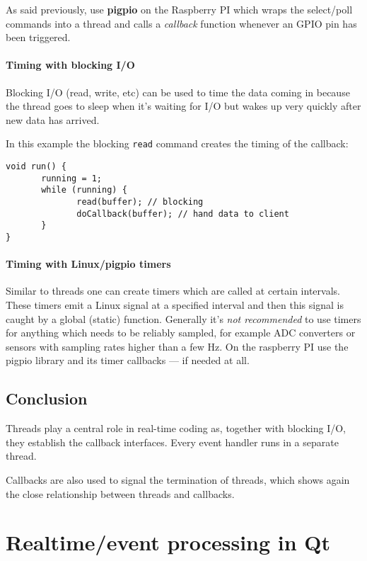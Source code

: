 \documentclass[12pt]{report}
\begin{document}
As said previously, use \textbf{pigpio} on the Raspberry PI
which wraps the select/poll commands into a thread and calls a
\textsl{callback} function whenever an GPIO pin has been triggered.


\subsubsection{Timing with blocking I/O}
Blocking I/O (read, write, etc) can be used to time
the data coming in because the thread goes to sleep when it's waiting for
I/O but wakes up very quickly after new data has arrived.

In this example the blocking \texttt{read} command creates
the timing of the callback:
\begin{verbatim}
void run() {
       running = 1;
       while (running) {
              read(buffer); // blocking
              doCallback(buffer); // hand data to client
       }
}
\end{verbatim}


\subsubsection{Timing with Linux/pigpio timers}
Similar to threads one can create timers which are called at certain
intervals. These timers emit a Linux signal at a specified interval
and then this signal is caught by a global (static) function.
Generally it's \textsl{not recommended} to use timers for anything
which needs to be reliably sampled, for example ADC converters or
sensors with sampling rates higher than a few Hz. On the raspberry PI
use the pigpio library and its timer callbacks --- if needed at all.

\section{Conclusion}
Threads play a central role in real-time coding as,
together with blocking I/O, they establish
the callback interfaces. Every event handler
runs in a separate thread.

Callbacks are also used to signal the termination of
threads, which shows again the close relationship between threads
and callbacks.



\chapter{Realtime/event processing in Qt}
\end{document}
